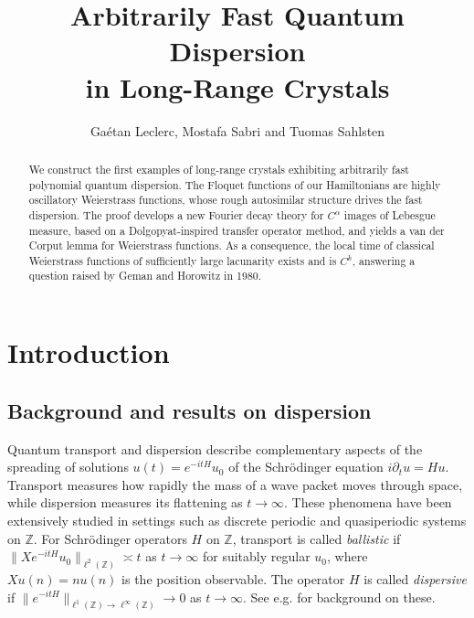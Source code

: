 \documentclass[11pt]{amsart}
\title[Arbitrarily Fast Quantum Dispersion in Long-Range Crystals]{Arbitrarily Fast Quantum Dispersion \\ in Long-Range Crystals}
\author{Ga\'etan Leclerc, Mostafa Sabri and Tuomas Sahlsten}
\theoremstyle{plain}
\theoremstyle{definition}
\numberwithin{equation}{section}
\begin{document}
\begin{abstract}
We construct the first examples of long-range crystals exhibiting arbitrarily fast polynomial quantum dispersion. The Floquet functions of our Hamiltonians are highly oscillatory Weierstrass functions, whose rough autosimilar structure drives the fast dispersion. The proof develops a new Fourier decay theory for $C^\alpha$ images of Lebesgue measure, based on a Dolgopyat-inspired transfer operator method, and yields a van der Corput lemma for Weierstrass functions. As a consequence, the local time of classical Weierstrass functions of sufficiently large lacunarity exists and is $C^k$, answering a question raised by Geman and Horowitz in 1980.
\end{abstract}

\maketitle

\section{Introduction}

\subsection{Background and results on dispersion} Quantum transport and dispersion describe complementary aspects of the spreading of solutions $u(t)=e^{-itH}u_0$ of the Schr\"odinger equation $i\partial_tu=Hu$. Transport measures how rapidly the mass of a wave packet moves through space, while dispersion measures its flattening as $t\to\infty$. These phenomena have been extensively studied in settings such as discrete periodic and quasiperiodic systems on $\mathbb Z$. For Schr\"odinger operators $H$ on $\mathbb Z$, transport is called \textit{ballistic} if $\|Xe^{-itH}u_0\|_{\ell^2(\mathbb Z)}\asymp t$ as $t\to\infty$ for suitably regular $u_0$, where $Xu(n)=nu(n)$ is the position observable. The operator $H$ is called \textit{dispersive} if $\|e^{-itH}\|_{\ell^1(\mathbb Z)\to\ell^\infty(\mathbb Z)}\to0$ as $t\to\infty$. See e.g. \cite{DamanikMalinovitchYoung,BoutetdeMonvelSabri} for background on these.
\end{document}
